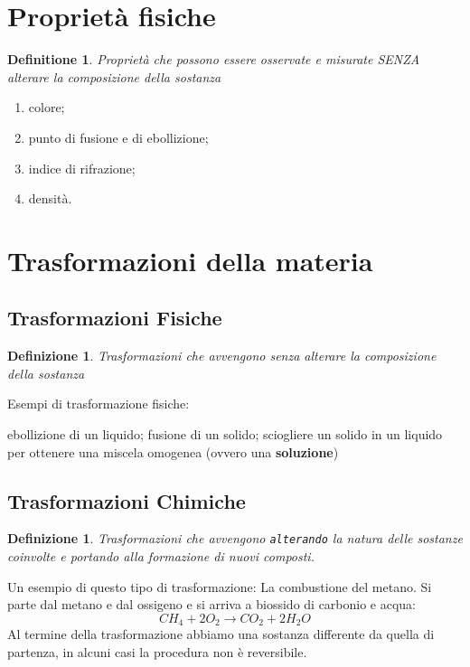 \documentclass{book}
\begin{document}
\section{Proprietà fisiche}
\newtheorem{profisiche}{Definitione}
\begin{profisiche} 
	Proprietà che possono essere osservate e misurate SENZA alterare la composizione della sostanza
\end{profisiche}
\begin{enumerate}
	\item colore;
	\item punto di fusione e di ebollizione;
	\item indice di rifrazione;
	\item densità.
\end{enumerate}
\section{Trasformazioni della materia}
\subsection{Trasformazioni Fisiche}
\newtheorem{trfisiche}{Definizione}
\begin{trfisiche}
	Trasformazioni che avvengono senza alterare la composizione della sostanza
\end{trfisiche}
Esempi di trasformazione fisiche:
\begin{tasks}{2}
	\task ebollizione di un liquido;
	\task fusione di un solido;
	\task sciogliere un solido in un liquido per ottenere una miscela omogenea (ovvero una \textbf{soluzione})
\end{tasks}
\subsection{Trasformazioni Chimiche}
\newtheorem{trchimiche}{Definizione}
\begin{trchimiche}
	Trasformazioni che avvengono \texttt{alterando} la natura delle sostanze coinvolte e portando alla formazione di nuovi composti.
\end{trchimiche}
Un esempio di questo tipo di trasformazione: La combustione del metano. Si parte dal metano e dal ossigeno e si arriva a biossido di carbonio e acqua:
\begin{equation*}
	CH_4+ 2O_2\to CO_2+2H_2O
\end{equation*}
Al termine della trasformazione abbiamo una sostanza differente da quella di partenza, in alcuni casi la procedura non è reversibile.
\end{document}

